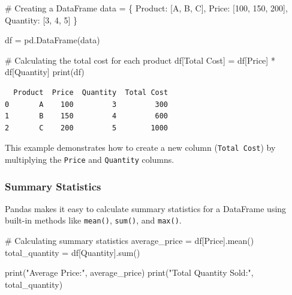 \documentclass[
  letterpaper,
  DIV=11,
  numbers=noendperiod]{scrreprt}
\newenvironment{Shaded}{\begin{snugshade}}{\end{snugshade}}
\newcommand{\BuiltInTok}[1]{\textcolor[rgb]{0.00,0.23,0.31}{#1}}
\newcommand{\CommentTok}[1]{\textcolor[rgb]{0.37,0.37,0.37}{#1}}
\newcommand{\DecValTok}[1]{\textcolor[rgb]{0.68,0.00,0.00}{#1}}
\newcommand{\NormalTok}[1]{\textcolor[rgb]{0.00,0.23,0.31}{#1}}
\newcommand{\OperatorTok}[1]{\textcolor[rgb]{0.37,0.37,0.37}{#1}}
\newcommand{\StringTok}[1]{\textcolor[rgb]{0.13,0.47,0.30}{#1}}
\begin{document}
\begin{Shaded}
\begin{Highlighting}[]
\CommentTok{\# Creating a DataFrame}
\NormalTok{data }\OperatorTok{=}\NormalTok{ \{}
    \StringTok{\textquotesingle{}Product\textquotesingle{}}\NormalTok{: [}\StringTok{\textquotesingle{}A\textquotesingle{}}\NormalTok{, }\StringTok{\textquotesingle{}B\textquotesingle{}}\NormalTok{, }\StringTok{\textquotesingle{}C\textquotesingle{}}\NormalTok{],}
    \StringTok{\textquotesingle{}Price\textquotesingle{}}\NormalTok{: [}\DecValTok{100}\NormalTok{, }\DecValTok{150}\NormalTok{, }\DecValTok{200}\NormalTok{],}
    \StringTok{\textquotesingle{}Quantity\textquotesingle{}}\NormalTok{: [}\DecValTok{3}\NormalTok{, }\DecValTok{4}\NormalTok{, }\DecValTok{5}\NormalTok{]}
\NormalTok{\}}

\NormalTok{df }\OperatorTok{=}\NormalTok{ pd.DataFrame(data)}

\CommentTok{\# Calculating the total cost for each product}
\NormalTok{df[}\StringTok{\textquotesingle{}Total Cost\textquotesingle{}}\NormalTok{] }\OperatorTok{=}\NormalTok{ df[}\StringTok{\textquotesingle{}Price\textquotesingle{}}\NormalTok{] }\OperatorTok{*}\NormalTok{ df[}\StringTok{\textquotesingle{}Quantity\textquotesingle{}}\NormalTok{]}
\BuiltInTok{print}\NormalTok{(df)}
\end{Highlighting}
\end{Shaded}

\begin{verbatim}
  Product  Price  Quantity  Total Cost
0       A    100         3         300
1       B    150         4         600
2       C    200         5        1000
\end{verbatim}

This example demonstrates how to create a new column
(\texttt{Total\ Cost}) by multiplying the \texttt{Price} and
\texttt{Quantity} columns.

\hypertarget{summary-statistics-1}{%
\subsubsection{Summary Statistics}\label{summary-statistics-1}}

Pandas makes it easy to calculate summary statistics for a DataFrame
using built-in methods like \texttt{mean()}, \texttt{sum()}, and
\texttt{max()}.

\begin{Shaded}
\begin{Highlighting}[]
\CommentTok{\# Calculating summary statistics}
\NormalTok{average\_price }\OperatorTok{=}\NormalTok{ df[}\StringTok{\textquotesingle{}Price\textquotesingle{}}\NormalTok{].mean()}
\NormalTok{total\_quantity }\OperatorTok{=}\NormalTok{ df[}\StringTok{\textquotesingle{}Quantity\textquotesingle{}}\NormalTok{].}\BuiltInTok{sum}\NormalTok{()}

\BuiltInTok{print}\NormalTok{(}\StringTok{"Average Price:"}\NormalTok{, average\_price)}
\BuiltInTok{print}\NormalTok{(}\StringTok{"Total Quantity Sold:"}\NormalTok{, total\_quantity)}
\end{Highlighting}
\end{Shaded}
\end{document}
